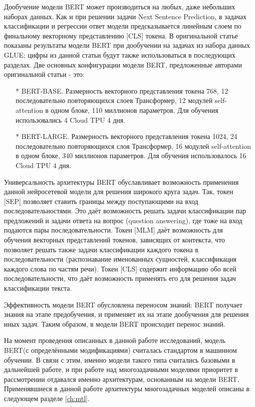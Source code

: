 Дообучение модели BERT может производиться на любых, даже небольших наборах данных. Как и при решении задачи Next Sentence Prediction, в задачах классификации и регрессии ответ модели предсказывается линейным слоем по финальному векторному представлению [CLS] токена. В оригинальной статье показаны результаты модели BERT при дообучении на задачах из набора данных GLUE; цифры из данной статьи будут также использоваться в последующих разделах. 
Две основных конфигурации модели BERT, предложенные авторами оригинальной статьи - это:
\begin{itemize}
\item[*] BERT-BASE. Размерность векторного представления токена 768, 12 последовательно повторяющихся слоев Трансформер, 12 модулей self-attention в одном блоке, 110 миллионов параметров. Для обучения использовались 4 Cloud TPU 4 дня. 
\item[*] BERT-LARGE. Размерность векторного представления токена 1024, 24 последовательно повторяющихся слоя Трансформер, 16 модулей self-attention в одном блоке, 340 миллионов параметров. Для обучения использовалось 16 Cloud TPU 4 дня. 
\end{itemize}

Универсальность архитектуры BERT обуславливает возможность применения данной нейросетевой модели для решения широкого круга задач. Так, токен [SEP] позволяет ставить границы между поступающими на вход последовательностями. Это даёт возможность решать задачи классификации пар предложений и задачи ответа на вопрос (question answering), где тоже на вход подаются пары последовательности. Токен [MLM] даёт возможность для обучения векторных представлений токенов, зависящих от контекста, что позволяет решать также задачи классификации каждого токена в последовательности (распознавание именованных сущностей, классификация каждого слова по частям речи). Токен [CLS] содержит информацию обо всей последовательности, что даёт возможность применять его для решения задач классификации текста. 

Эффективность модели BERT обусловлена переносом знаний: BERT получает знания на этапе предобучения, и применяет их на этапе дообучения для решения иных задач. Таким образом, в модели BERT происходит перенос знаний. 

На момент проведения описанных в данной работе исследований, модель BERT(с определёнными модификациями) считалась стандартом в машинном обучении. В связи с этим, именно модели такого типа считались базовыми в дальнейшей работе, и при работе над многозадачными моделями приоритет в рассмотрении отдавался именно архитектурам, основанным на модели BERT. Применявшиеся в данной работе архитектуры многозадачных моделей описаны в следующем разделе \ref{ch:mtl}.

